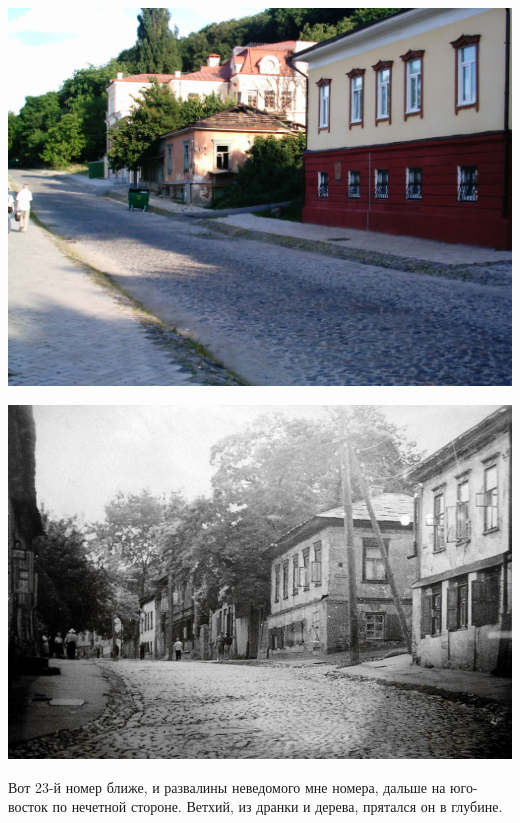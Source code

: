 \newpage
\vspace*{\fill}
\begin{center}
\includegraphics[width=0.95\linewidth]{chast-colebanie-osnov/borichev-tok/bort-imag0001.jpg}
\end{center}

\begin{center}
\includegraphics[width=0.95\linewidth]{chast-colebanie-osnov/borichev-tok/bor-tok-23.jpg}
\end{center}
\vspace*{\fill}
\newpage

Вот 23-й номер ближе, и развалины неведомого мне номера, дальше на юго-восток по нечетной стороне. Ветхий, из дранки и дерева, прятался он в глубине.


